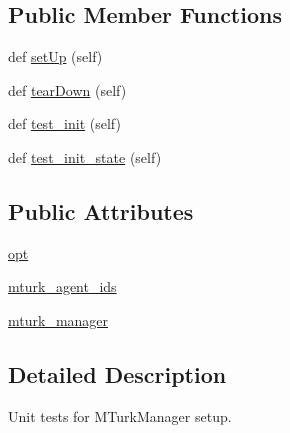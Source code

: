 \subsection*{Public Member Functions}
\begin{DoxyCompactItemize}
\item 
def \hyperlink{classparlai_1_1mturk_1_1core_1_1test_1_1test__mturk__manager_1_1InitTestMTurkManager_ac7aa478ee0d637bd5ca3fb4d40b0d483}{set\+Up} (self)
\item 
def \hyperlink{classparlai_1_1mturk_1_1core_1_1test_1_1test__mturk__manager_1_1InitTestMTurkManager_a915e45dc058a29ebbd1942cd56418cfe}{tear\+Down} (self)
\item 
def \hyperlink{classparlai_1_1mturk_1_1core_1_1test_1_1test__mturk__manager_1_1InitTestMTurkManager_ac038f59a9e49e1378a6fa37c418c6317}{test\+\_\+init} (self)
\item 
def \hyperlink{classparlai_1_1mturk_1_1core_1_1test_1_1test__mturk__manager_1_1InitTestMTurkManager_adf2acf81be629e8f652e7ccf07e7d8b3}{test\+\_\+init\+\_\+state} (self)
\end{DoxyCompactItemize}
\subsection*{Public Attributes}
\begin{DoxyCompactItemize}
\item 
\hyperlink{classparlai_1_1mturk_1_1core_1_1test_1_1test__mturk__manager_1_1InitTestMTurkManager_a3ca0ab7eece61ed39c2bc082a5544c3b}{opt}
\item 
\hyperlink{classparlai_1_1mturk_1_1core_1_1test_1_1test__mturk__manager_1_1InitTestMTurkManager_a5508c8484a1d2ee173b1e8dfab105089}{mturk\+\_\+agent\+\_\+ids}
\item 
\hyperlink{classparlai_1_1mturk_1_1core_1_1test_1_1test__mturk__manager_1_1InitTestMTurkManager_a7b7846e3001c077cc4c27d1b6464af25}{mturk\+\_\+manager}
\end{DoxyCompactItemize}


\subsection{Detailed Description}
\begin{DoxyVerb}Unit tests for MTurkManager setup.
\end{DoxyVerb}
 

